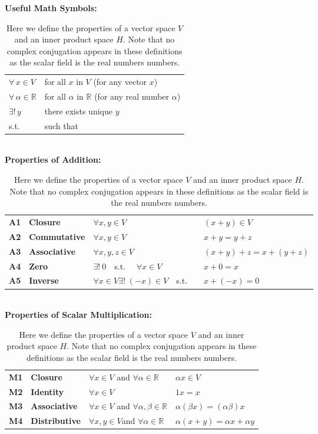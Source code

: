 \documentclass[12pt]{article}
\begin{document}
\begin{table}
\caption{ \label{tbl:ipspace} Here we define the properties of a vector space $V$ 
and an inner product space $H$.  Note that no complex conjugation appears in these definitions as the scalar field is the real numbers numbers.}
\begin{center}
{\bf Useful Math Symbols:}\\
\begin{tabular}{ll}
  $\forall \, x \in V$ & for all $x$ in $V$ (for any vector $x$)\\
  $\forall \, \alpha \in \mathbb{R}$ & for all $\alpha$ in $\mathbb{R}$ (for any real number $\alpha$) \\
  $\exists ! \, y$ & there exists unique $y$ \\
  s.t.          & such that \\
\end{tabular}\\    
\vskip 0.5cm
{\bf Properties of Addition:}\\
\begin{tabular}{llll}
{\bf A1} & {\bf Closure} & $\forall x,y \in V$ & $(x+y) \in V $\\
{\bf A2} & {\bf Commutative} & $\forall x,y \in V$ & $x+y=y+z$\\
{\bf A3} & {\bf Associative} & $\forall x,y,z \in V$ & $(x+y)+z = x+(y+z)$\\
{\bf A4} & {\bf Zero}        & $\exists !~0$~~s.t.~~ $\forall x \in V$ & $x+0 = x$ \\
{\bf A5} & {\bf Inverse} & $\forall x \in V \exists !\;(-x) \in V$~~s.t.~~& $x+(-x)=0$\\
\end{tabular} \\
\vskip 0.5cm
{\bf Properties of Scalar Multiplication:}\\
\begin{tabular}{llll}
  {\bf M1} & {\bf Closure} & $\forall x \in V$ and $\forall \alpha \in \mathbb{R}$ & $\alpha x \in V$\\
  {\bf M2} & {\bf Identity} & $\forall x \in V$ & $1x=x$\\
  {\bf M3} & {\bf Associative} & $\forall x \in V$
and $\forall \alpha,\beta \in \mathbb{R}$ & $\alpha(\beta x) = (\alpha \beta) x$\\
{\bf M4} & {\bf Distributive} & $\forall x,y \in V$and $\forall \alpha \in \mathbb{R}$ & $\alpha(x+y) = \alpha x + \alpha y$ \\

\end{tabular}
\end{center}
\end{table}
\end{document}
